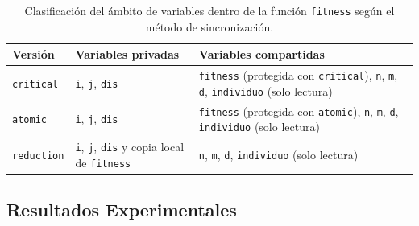 \documentclass[12pt]{article}
\begin{document}
\begin{enumerate}
\begin{table}[htbp]
    \centering
    \small
    \begin{tabular}{lll}
        \toprule
        \textbf{Versión} & \textbf{Variables privadas} & \textbf{Variables compartidas} \\
        \midrule
        \texttt{critical} & \texttt{i}, \texttt{j}, \texttt{dis} & \texttt{fitness} (protegida con \texttt{critical}), \texttt{n}, \texttt{m}, \texttt{d}, \texttt{individuo} (solo lectura) \\
        \texttt{atomic} & \texttt{i}, \texttt{j}, \texttt{dis} & \texttt{fitness} (protegida con \texttt{atomic}), \texttt{n}, \texttt{m}, \texttt{d}, \texttt{individuo} (solo lectura) \\
        \texttt{reduction} & \texttt{i}, \texttt{j}, \texttt{dis} y copia local de \texttt{fitness} & \texttt{n}, \texttt{m}, \texttt{d}, \texttt{individuo} (solo lectura) \\
        \bottomrule
    \end{tabular}
    \caption{Clasificación del ámbito de variables dentro de la función \texttt{fitness} según el método de sincronización.}
    \label{tab:variables_fitness}
\end{table}

\subsection*{Resultados Experimentales}


\end{enumerate}
\end{document}
